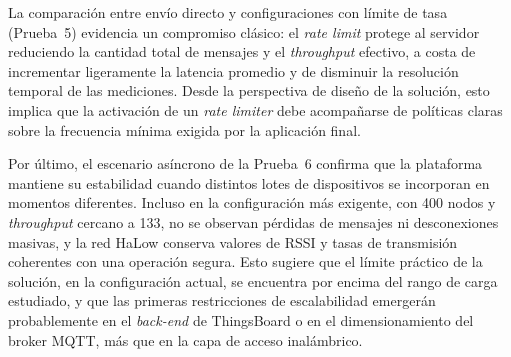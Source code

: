 La comparaci\'on entre env\'io directo y configuraciones con l\'imite de tasa (Prueba~5) evidencia un compromiso cl\'asico: el \emph{rate limit} protege al servidor reduciendo la cantidad total de mensajes y el \emph{throughput} efectivo, a costa de incrementar ligeramente la latencia promedio y de disminuir la resoluci\'on temporal de las mediciones. Desde la perspectiva de dise\~no de la soluci\'on, esto implica que la activaci\'on de un \emph{rate limiter} debe acompa\~narse de pol\'iticas claras sobre la frecuencia m\'inima exigida por la aplicaci\'on final.

Por \'ultimo, el escenario as\'incrono de la Prueba~6 confirma que la plataforma mantiene su estabilidad cuando distintos lotes de dispositivos se incorporan en momentos diferentes. Incluso en la configuraci\'on m\'as exigente, con \num{400} nodos y \emph{throughput} cercano a \SI{133}{}, no se observan p\'erdidas de mensajes ni desconexiones masivas, y la red HaLow conserva valores de RSSI y tasas de transmisi\'on coherentes con una operaci\'on segura. Esto sugiere que el l\'imite pr\'actico de la soluci\'on, en la configuraci\'on actual, se encuentra por encima del rango de carga estudiado, y que las primeras restricciones de escalabilidad emerger\'an probablemente en el \emph{back-end} de ThingsBoard o en el dimensionamiento del broker MQTT, m\'as que en la capa de acceso inal\'ambrico.
